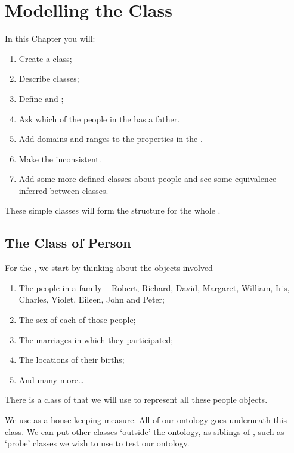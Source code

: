 \chapter{Modelling the  Class}
\label{chap:person}
\taskstart 

In this Chapter you will:
\begin{enumerate}
\item Create a  class;
\item Describe  classes;
\item Define  and ;
\item Ask which of the people in the \fhkb has a father.
\item Add domains and ranges to the properties in the \fhkb.
\item Make the \fhkb inconsistent.
\item  Add some more defined classes about people and see some equivalence  inferred between classes.
\end{enumerate}
These simple classes will form the structure for the whole \fhkb.


\section{The Class of Person}

For the \fhkb, we start by thinking about the objects involved
\begin{enumerate}
\item The people in a family -- Robert, Richard, David, Margaret, William, Iris, Charles, Violet, Eileen, John and Peter;
\item The sex of each of those people;
\item The marriages in which they participated;
\item The locations of their births;
\item And many more\ldots
\end{enumerate}

There is a class of  that we will use to represent all these people objects.

\noindent We use  as a house-keeping measure. All of our ontology goes underneath this class. We can put other classes `outside' the ontology, as siblings of , such as `probe' classes we wish to use to test our ontology.

